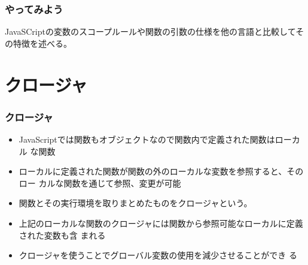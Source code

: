 \begin{frame}[containsverbatim]
 \frametitle{やってみよう}
JavaSCriptの変数のスコープルールや関数の引数の仕様を他の言語と比較してそ
 の特徴を述べる。
\end{frame}

\section{クロージャ}
\begin{frame}[containsverbatim]
 \frametitle{クロージャ}
\begin{itemize}
	 \item  JavaScriptでは関数もオブジェクトなので関数内で定義された関数はローカル
 な関数
	 \item ローカルに定義された関数が関数の外のローカルな変数を参照すると、そのロー
				 カルな関数を通じて参照、変更が可能
 \item 関数とその実行環境を取りまとめたものをクロージャという。
 \item 上記のローカルな関数のクロージャには関数から参照可能なローカルに定義された変数も含
			 まれる
 \item クロージャを使うことでグローバル変数の使用を減少させることができ
			 る
	\end{itemize}
\end{frame}

